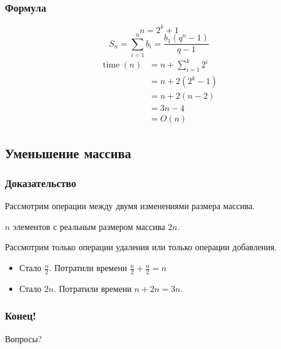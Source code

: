 \documentclass[pdf,russian,aspectratio=169]{beamer}
\begin{document}
\begin{frame}
  \frametitle{Формула}
  \[
    n = 2^k + 1
  \]
  \pause
  \[
    S_n=\sum_{i=1}^n b_i = \frac{b_1(q^n-1)}{q-1}
  \]
  \pause
  \begin{align*}
    \operatorname{time}(n) &= n + \sum_{i=1}^k 2^i\\
    &= n + 2(2^k-1)\\
    &=n+2(n-2)\\
    &=3n-4\\
    &=O(n)
  \end{align*}
\end{frame}

\subsection{Уменьшение массива}

\begin{frame}[fragile]
  \frametitle{Доказательство}
  Рассмотрим операции между двумя изменениями размера массива.

  \pause
  $n$ элементов с реальным размером массива $2n$.
  \begin{center}
  \end{center}

  \pause
  Рассмотрим только операции удаления или только операции добавления.

  \begin{itemize}
    \pause
    \item Стало $\frac{n}{2}$. \pause
      Потратили времени $\frac{n}{2} + \frac{n}{2} = n$
    \pause
    \item Стало $2n$. \pause Потратили времени $n+2n=3n$.
  \end{itemize}
\end{frame}

\begin{frame}
  \frametitle{Конец!}
  Вопросы?
\end{frame}
\end{document}
